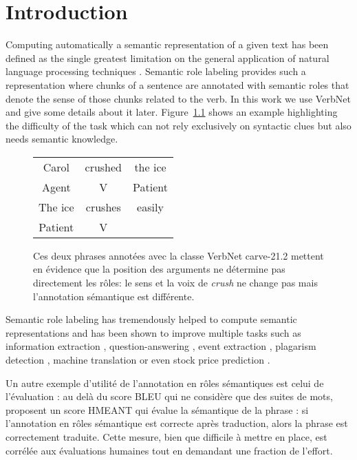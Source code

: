 \chapter{Introduction}
\label{ch:srlintro}


Computing automatically a semantic representation of a given text has been
defined as the single greatest limitation on the general application of natural
language processing techniques \citep{dang1998investigating}. Semantic role
labeling provides such a representation where chunks of a sentence are
annotated with semantic roles that denote the sense of those chunks related to
the verb. In this work we use VerbNet \citep{kipperschuler2005verbnet} and give
some details about it later. Figure~\ref{fig:example_srl} shows an example
highlighting the difficulty of the task which can not rely exclusively on
syntactic clues but also needs semantic knowledge.

\begin{figure}[ht]
    \centering
    \begin{tabular}{ccc}
        \toprule
        Carol & crushed   & the ice \\
        Agent & V         & Patient \\
        \midrule
        The ice & crushes & easily  \\
        Patient & V       &         \\
        \bottomrule
    \end{tabular}
    \caption{\label{fig:example_srl}Ces deux phrases annotées avec la classe VerbNet carve-21.2 mettent en évidence que la position des arguments ne détermine pas directement les rôles: le sens et la voix de \textit{crush} ne change pas mais l'annotation sémantique est différente.}
\end{figure}

Semantic role labeling has tremendously helped to compute semantic
representations and has been shown to improve multiple tasks such as
information extraction \citep{surdeanu2003using}, question-answering
\citep{shen2007using}, event extraction \citep{exner2011using},
plagarism detection \citep{osman2012improved}, machine translation
\citep{bazrafshan2013semantic} or even stock price prediction
\citep{xie2013semantic}.

Un autre exemple d'utilité de l'annotation en rôles sémantiques est celui de
l'évaluation : au delà du score BLEU qui ne considère que des suites de mots,
\cite{lo2011smt} proposent un score HMEANT qui évalue la sémantique de la
phrase : si l'annotation en rôles sémantique est correcte après traduction,
alors la phrase est correctement traduite. Cette mesure, bien que difficile à
mettre en place, est corrélée aux évaluations humaines tout en demandant une
fraction de l'effort.


